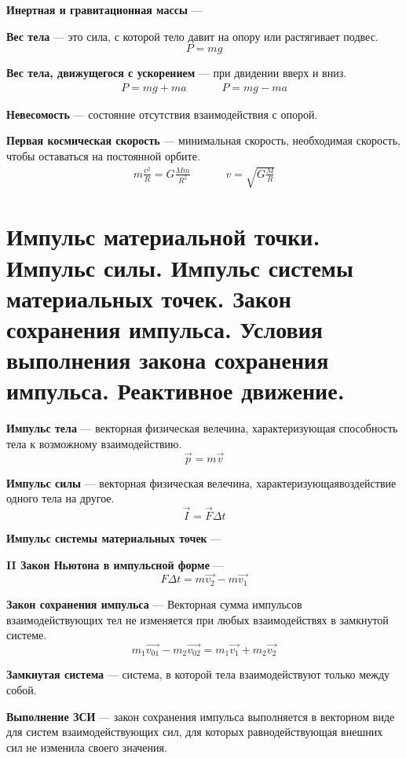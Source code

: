 \documentclass{report}
\begin{document}
{\bf Инертная и гравитационная массы} ---

{\bf Вес тела} ---
это сила, с которой тело давит на опору или растягивает подвес.
$$
P=mg
$$

{\bf Вес тела, движущегося с ускорением} ---
при двидении вверх и вниз.
$$
  \begin{array}{ccccc}
    P=mg + ma &&&& P=mg-ma 
  \end{array}
$$

{\bf Невесомость} ---
состояние отсутствия взаимодействия с опорой.

{\bf Первая космическая скорость} ---
минимальная скорость, необходимая скорость, чтобы оставаться на постоянной орбите.
$$
  \begin{array}{ccccc}
    m\frac{v^2}{R}=G\frac{Mm}{R^2} &&&& v=\sqrt{G\frac{M}{R}}
  \end{array}
$$



\part{Импульс материальной точки. 
Импульс силы. 
Импульс системы материальных точек. 
Закон сохранения импульса. 
Условия выполнения закона сохранения импульса. 
Реактивное движение.}

{\bf Импульс тела} ---
векторная физическая велечина, характеризующая способность тела к возможному взаимодействию.
$$
\vec{p}=m\vec{v}
$$

{\bf Импульс силы} ---
векторная физическая велечина, характеризующаявоздействие одного тела на другое.
$$
\vec{I}=\vec{F}\Delta t
$$

{\bf Импульс системы материальных точек} ---

{\bf II Закон Ньютона в импульсной форме} ---
$$
F\Delta t=m\vec{v_2}-m\vec{v_1}
$$

{\bf Закон сохранения импульса} ---
Векторная сумма импульсов взаимодействующих тел не изменяется при любых взаимодействях в
замкнутой системе.
$$
m_1\overrightarrow{v_{01}}-m_2\overrightarrow{v_{02}}=
m_1\overrightarrow{v_1}+m_2\overrightarrow{v_2}
$$

{\bf Замкнутая система} ---
система, в которой тела взаимодействуют только между собой.

{\bf Выполнение ЗСИ} ---
закон сохранения импульса выполняется в векторном виде для систем взаимодействующих
сил, для которых равнодействующая внешних сил не изменила своего значения.
\end{document}
